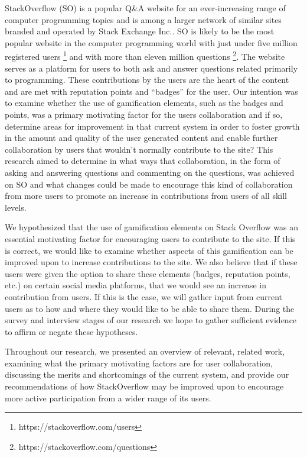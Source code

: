 \documentclass{sigchi}
\begin{document}
StackOverflow (SO) is a popular Q\&A website for an ever-increasing range of computer programming topics and is among a larger network of similar sites branded and operated by Stack Exchange Inc.. SO is likely to be the most popular website in the computer programming world with just under five million registered users \footnote{https://stackoverflow.com/users} and with more than eleven million questions \footnote{https://stackoverflow.com/questions}. The website serves as a platform for users to both ask and answer questions related primarily to programming. These contributions by the users are the heart of the content and are met with reputation points and “badges” for the user. Our intention was to examine whether the use of gamification elements, such as the badges and points, was a primary motivating factor for the users collaboration and if so, determine areas for improvement in that current system in order to foster growth in the amount and quality of the user generated content and enable further collaboration by users that wouldn't normally contribute to the site?
This research aimed to determine in what ways that collaboration, in the form of asking and answering questions and commenting on the questions, was achieved on SO and what changes could be made to encourage this kind of collaboration from more users to promote an increase in contributions from users of all skill levels.


We hypothesized that the use of gamification elements on Stack Overflow was an essential motivating factor for encouraging users to contribute to the site. If this is correct, we would like to examine whether aspects of this gamification can be improved upon to increase contributions to the site. We also believe that if these users were given the option to share these elements (badges, reputation points, etc.) on certain social media platforms, that we would see an increase in contribution from users. If this is the case, we will gather input from current users as to how and where they would like to be able to share them. During the survey and interview stages of our research we hope to gather sufficient evidence to affirm or negate these hypotheses.


Throughout our research, we presented an overview of relevant, related work, examining what the primary motivating factors are for user collaboration, discussing the merits and shortcomings of the current system, and provide our recommendations of how StackOverflow may be improved upon to encourage more active participation from a wider range of its users.
\end{document}
